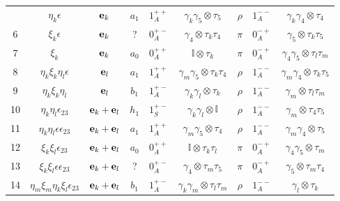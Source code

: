 \begin{table}
\begin{center}
\begin{tabular}{c|c|c|ccc|ccc}
   & $\eta _k\epsilon$                           & ${\bf e}_k$                     & $a_1$    & $1^{++}_A$ & $\gamma _k\gamma _5\otimes \tau _5$          & $\rho$   & $1^{--}_A$ & $\gamma _k\gamma _4\otimes \tau _4$          \\
\textcolor[rgb]{1,0,0}{6}  
   & $\xi _k\epsilon $                           & ${\bf e}_k$                     & ?        & $0^{+-}_A$ & $\gamma _4 \otimes \tau _k \tau _4$          & $\pi$    & $0^{-+}_A$ & $\gamma _5 \otimes \tau _k\tau _5$           \\
\textcolor[rgb]{1,0,0}{7}
   & $\xi_k$                                     & ${\bf e}_k$                     & $a_0$    & $0^{++}_A$ & $\mathbb{I}\otimes \tau _k$                  & $\pi$    & $0^{-+}_A$ & $\gamma _4\gamma _5\otimes \tau _l \tau _m$  \\
\textcolor[rgb]{1,0,0}{8}
   & $\eta _k\xi _k \eta _l \epsilon$            & ${\bf e}_l$                     & $a_1$    & $1^{++}_A$ & $\gamma _m\gamma _5\otimes \tau _k\tau _4$   & $\rho$   & $1^{--}_A$ & $\gamma _m\gamma _4\otimes \tau _k \tau _5$  \\
\textcolor[rgb]{1,0,0}{$9$}
   & $\eta_k\xi_k\eta_l$                         & ${\bf e}_l$                     & $b_1$    & $1^{+-}_A$ & $\gamma _k\gamma _l \otimes \tau _k$         & $\rho$   & $1^{--}_A$ & $\gamma _m \otimes \tau _l\tau _m$           \\
10 & $\eta _k\eta _l \epsilon _{23}$             & ${\bf e}_k+{\bf e}_l$           & $h_1$    & $1^{+-}_S$ & $\gamma _k\gamma _l\otimes \mathbb{I}$       & $\rho$   & $1^{--}_A$ & $\gamma _m\otimes \tau _4\tau _5$ \\
11 & $\eta _k\eta _l \epsilon\epsilon _{23}$     & ${\bf e}_k+{\bf e}_l$           & $a_1$    & $1^{++}_A$ & $\gamma _m\gamma _5\otimes \tau _4$          & $\rho$   & $1^{--}_A$ & $\gamma _m\gamma _4\otimes \tau _5$ \\
12 & $\xi _k\xi _l \epsilon _{23}$               & ${\bf e}_k+{\bf e}_l$           & $a_0$    & $0^{++}_A$ & $\mathbb{I}\otimes \tau _k\tau _l$           & $\pi$    & $0^{-+}_A$ & $\gamma _4\gamma _5\otimes \tau _m$ \\
13 & $\xi _k\xi _l \epsilon \epsilon _{23}$      & ${\bf e}_k+{\bf e}_l$           & ?        & $0^{+-}_A$ & $\gamma _4\otimes \tau _m\tau _5$            & $\pi$    & $0^{-+}_A$ & $\gamma _5\otimes \tau _m\tau _4$ \\
14 & $\eta _m\xi _m\eta _k\xi _l\epsilon_{23}$   & ${\bf e}_k+{\bf e}_l$           & $b_1$    & $1^{+-}_A$ & $\gamma _k\gamma _m\otimes \tau _l \tau _m$  & $\rho$   & $1^{--}_A$ & $\gamma _l\otimes \tau _k$ \\

\end{tabular}
\end{center}
\end{table}
